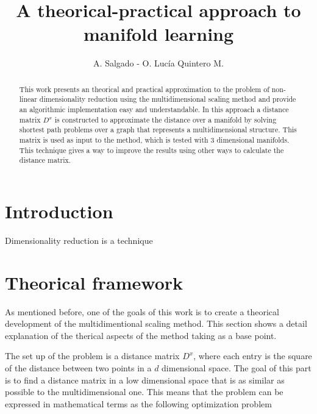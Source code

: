 \documentclass[12pt,journal]{IEEEtran}
\begin{document}
\title{A theorical-practical approach to manifold learning}
\author{A. Salgado - O. Lucía Quintero M.}
\maketitle

\begin{abstract}
    This work presents an theorical and practical approximation to the problem
    of non-linear dimensionality reduction using the multidimensional scaling
    method and provide an algorithmic implementation easy and understandable. In
    this approach a distance matrix $D^x$ is constructed to approximate the
    distance over a manifold by solving shortest path problems over a graph that
    represents a multidimensional structure. This matrix is used as input to the
    method, which is tested with 3 dimensional manifolds. This technique gives a
    way to improve the results using other ways to calculate the distance matrix.
\end{abstract}

\section{Introduction}

Dimensionality reduction is a technique

\cite{manifold}

\cite{dimension}

\cite{mds}

\section{Theorical framework}

    As mentioned before, one of the goals of this work is to create a theorical
    development of the multidimentional scaling method. This section shows a
    detail explanation of the therical aspects of the method taking \cite{proof}
    as a base point.

    \vspace{0.5cm}

    The set up of the problem is a distance matrix $D^x$, where each
    entry is the square of the distance between two points in a $d$ dimensional
    space. The goal of this part is to find a distance matrix in a low
    dimensional space that is as similar as possible to the multidimensional one.
    This means that the problem can be expressed in mathematical terms as the
    following optimization problem
\end{document}
